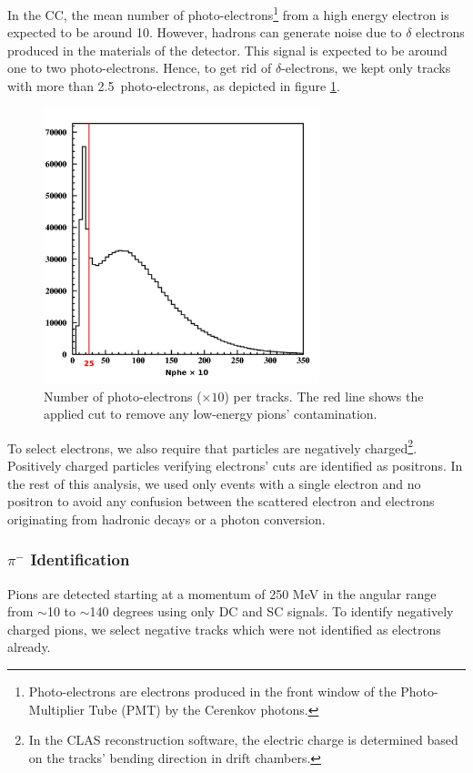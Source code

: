 In the CC, the mean number of photo-electrons\footnote{Photo-electrons are 
electrons produced in the front window of the Photo-Multiplier Tube (PMT) by the Cerenkov photons.} from a high energy electron is expected to be around 10.
However, hadrons can generate noise due to $\delta$ electrons produced in 
the materials of the detector. This signal is expected to be around 
one to two photo-electrons. Hence, to get rid of $\delta$-electrons, we kept only tracks with more than 2.5~photo-electrons, as depicted in figure \ref{delta}. 

\begin{figure}[tbp]
\centering
\includegraphics[width=8cm] {chap5-fig/fig04.png} 
\caption {Number of photo-electrons ($\times 10$) per tracks. The red line 
shows the applied cut to remove any low-energy pions' contamination.}
\label{delta}
\end{figure}

To select electrons, we also require that particles are negatively charged\footnote{In the CLAS reconstruction software, the electric charge is determined based on the tracks' bending direction in drift chambers.}.
Positively charged particles verifying electrons' cuts are identified as 
positrons. In the rest of this analysis, we used only events with a single electron and no positron to avoid any confusion between the scattered electron and electrons originating from hadronic decays or a photon conversion.

\subsubsection{$\pi^-$ Identification}
\label{PiId}

Pions are detected starting at a momentum of 250 MeV in the angular range 
from $\sim$10 to $\sim$140 degrees 
using only DC and SC signals. To identify negatively charged pions, we select 
negative tracks which were not identified as electrons already. 

